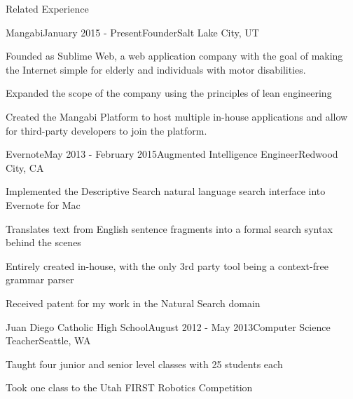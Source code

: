 \documentclass{resume}
\begin{document}
\begin{relatedExperience}
\begin{rSection}{Related Experience}

\begin{experienceMangabi}
\begin{rSubsection}{Mangabi}{January 2015 - Present}{Founder}{Salt Lake City, UT}
\item Founded as Sublime Web, a web application company with the goal of making the Internet simple for elderly and individuals with motor disabilities.
\item Expanded the scope of the company using the principles of lean engineering
\item Created the Mangabi Platform to host multiple in-house applications and allow for third-party developers to join the platform.
\end{rSubsection}
\end{experienceMangabi}


\begin{experienceEvernote}
\begin{rSubsection}{Evernote}{May 2013 - February 2015}{Augmented Intelligence Engineer}{Redwood City, CA}
\item Implemented the Descriptive Search natural language search interface into Evernote for Mac
\item Translates text from English sentence fragments into a formal search syntax behind the scenes
\item Entirely created in-house, with the only 3rd party tool being a context-free grammar parser
\item Received patent for my work in the Natural Search domain
\end{rSubsection}
\end{experienceEvernote}


\begin{experienceJDTeacher}
\begin{rSubsection}{Juan Diego Catholic High School}{August 2012 - May 2013}{Computer Science Teacher}{Seattle, WA}
\item Taught four junior and senior level classes with 25 students each
\item Took one class to the Utah FIRST Robotics Competition
\end{rSubsection}
\end{experienceJDTeacher}


\end{rSection}
\end{relatedExperience}
\end{document}
